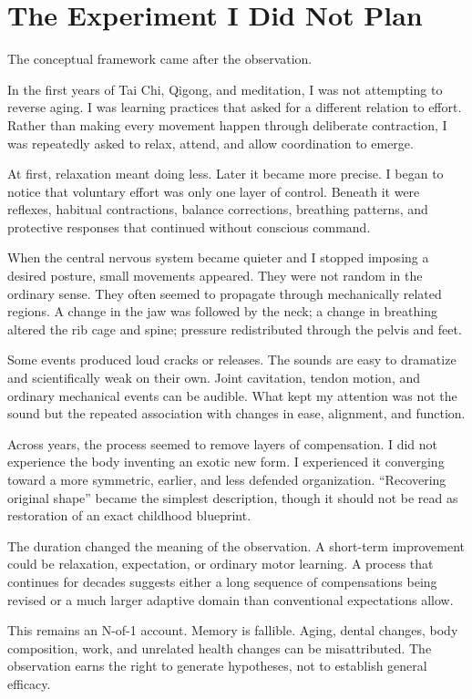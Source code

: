 \chapter{The Experiment I Did Not Plan}\label{chapter-13-the-experiment-i-did-not-plan}

The conceptual framework came after the observation.

In the first years of Tai Chi, Qigong, and meditation, I was not attempting to reverse aging. I was learning practices that asked for a different relation to effort. Rather than making every movement happen through deliberate contraction, I was repeatedly asked to relax, attend, and allow coordination to emerge.

At first, relaxation meant doing less. Later it became more precise. I began to notice that voluntary effort was only one layer of control. Beneath it were reflexes, habitual contractions, balance corrections, breathing patterns, and protective responses that continued without conscious command.

When the central nervous system became quieter and I stopped imposing a desired posture, small movements appeared. They were not random in the ordinary sense. They often seemed to propagate through mechanically related regions. A change in the jaw was followed by the neck; a change in breathing altered the rib cage and spine; pressure redistributed through the pelvis and feet.

Some events produced loud cracks or releases. The sounds are easy to dramatize and scientifically weak on their own. Joint cavitation, tendon motion, and ordinary mechanical events can be audible. What kept my attention was not the sound but the repeated association with changes in ease, alignment, and function.

Across years, the process seemed to remove layers of compensation. I did not experience the body inventing an exotic new form. I experienced it converging toward a more symmetric, earlier, and less defended organization. ``Recovering original shape'' became the simplest description, though it should not be read as restoration of an exact childhood blueprint.

The duration changed the meaning of the observation. A short-term improvement could be relaxation, expectation, or ordinary motor learning. A process that continues for decades suggests either a long sequence of compensations being revised or a much larger adaptive domain than conventional expectations allow.

This remains an N-of-1 account. Memory is fallible. Aging, dental changes, body composition, work, and unrelated health changes can be misattributed. The observation earns the right to generate hypotheses, not to establish general efficacy.
